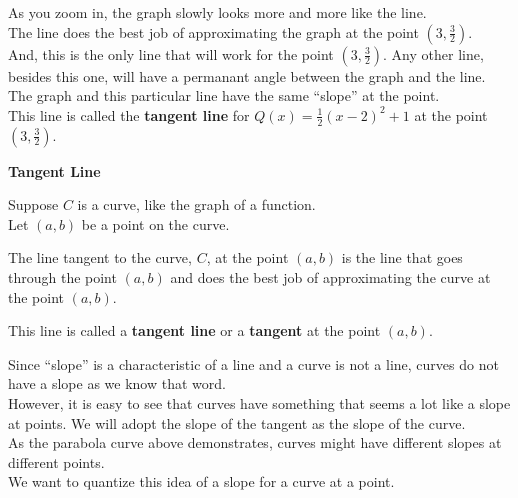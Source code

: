 \documentclass{ximera}
\begin{document}
As you zoom in, the graph slowly looks more and more like the line. \\


The line does the best job of approximating the graph at the point $\left( 3, \frac{3}{2} \right)$. \\


And, this is the only line that will work for the point $\left( 3, \frac{3}{2} \right)$.  Any other line, besides this one, will have a permanant angle between the graph and the line.  \\

The graph and this particular line have the same ``slope'' at the point. \\


This line is called the \textbf{\textcolor{blue!55!black}{tangent line}} for $Q(x) = \frac{1}{2} (x - 2)^2 + 1$ at the point $\left( 3, \frac{3}{2} \right)$.




\begin{definition} \textbf{\textcolor{green!50!black}{Tangent Line}}


Suppose $C$ is a curve, like the graph of a function. \\

Let $(a, b)$ be a point on the curve.

The line tangent to the curve, $C$, at the point $(a, b)$ is the line that goes through the point $(a, b)$ and does the best job of approximating the curve at the point $(a, b)$.

This line is called a \textbf{tangent line} or a \textbf{tangent} at the point $(a, b)$.




\end{definition}


Since ``slope'' is a characteristic of a line and a curve is not a line, curves do not have a slope as we know that word. \\

However, it is easy to see that curves have something that seems a lot like a slope at points. We will adopt the slope of the tangent as the slope of the curve. \\

As the parabola curve above demonstrates, curves might have different slopes at different points. \\

We want to quantize this idea of a slope for a curve at a point. \\
\end{document}
